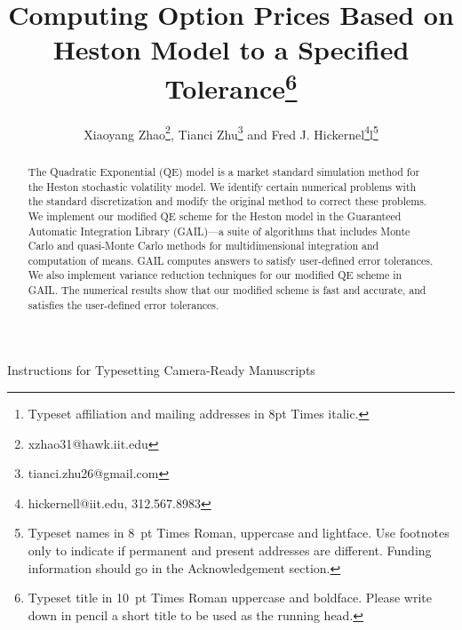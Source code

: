 \documentclass{ws-ijfe}
\begin{document}
{Instructions for Typesetting Camera-Ready Manuscripts}

\catchline{}{}{}{}{}

\title{Computing Option Prices Based on Heston Model to a Specified Tolerance\footnote{Typeset title in
10~pt Times Roman uppercase and boldface. Please write
down in pencil a short title to be used as the running head.}}

\author{Xiaoyang Zhao\footnote{xzhao31@hawk.iit.edu}, Tianci Zhu\footnote{tianci.zhu26@gmail.com} and Fred J. Hickernel\footnote{hickernell@iit.edu, 312.567.8983}l\footnote{Typeset names in 8~pt Times Roman, uppercase and lightface.  Use footnotes only to indicate if permanent and present addresses are different. Funding information should go in the Acknowledgement section.}}

\address{\footnote{Typeset
affiliation and mailing addresses in 8pt Times italic.} \\
10 W. 32rd Street, Chicago IL 60616\\Department of Applied Mathematics\\Illinois Institute of Technology}



\maketitle

\begin{abstract}
 The Quadratic Exponential (QE) model is a market standard simulation method for the Heston stochastic volatility model. We identify certain numerical problems with the standard discretization and modify the original method to correct these problems. We implement our modified QE scheme for the Heston model in the Guaranteed Automatic Integration Library (GAIL)---a suite of algorithms that includes Monte Carlo and quasi-Monte Carlo methods for multidimensional integration and computation of means. GAIL computes answers to satisfy user-defined error tolerances. We also implement variance reduction techniques for our modified QE scheme in GAIL. The numerical results show that our modified scheme is fast and accurate, and satisfies the user-defined error tolerances.

\end{abstract}
\end{document}

